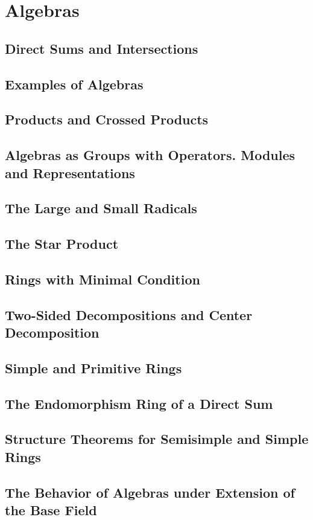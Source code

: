 \section{Algebras}

\subsection{Direct Sums and Intersections}

\subsection{Examples of Algebras}

\subsection{Products and Crossed Products}

\subsection{Algebras as Groups with Operators. Modules and Representations}

\subsection{The Large and Small Radicals}

\subsection{The Star Product}

\subsection{Rings with Minimal Condition}

\subsection{Two-Sided Decompositions and Center Decomposition}

\subsection{Simple and Primitive Rings}

\subsection{The Endomorphism Ring of a Direct Sum}

\subsection{Structure Theorems for Semisimple and Simple Rings}

\subsection{The Behavior of Algebras under Extension of the Base Field}